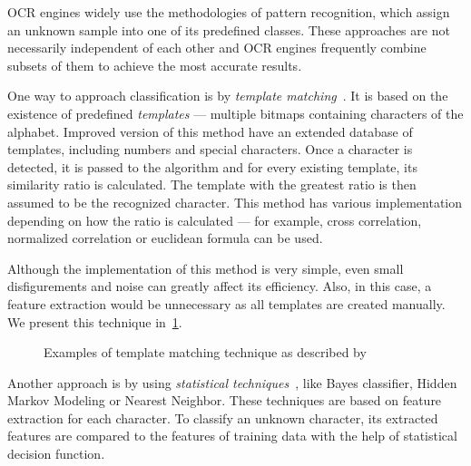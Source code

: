OCR engines widely use the methodologies of pattern recognition, which assign an unknown sample into one of its predefined classes. These approaches are not necessarily independent of each other and OCR engines frequently combine subsets of them to achieve the most accurate results.

One way to approach classification is by \emph{template matching}~\citep{templateMatching}. It is based on the existence of predefined \emph{templates} --- multiple bitmaps containing characters of the alphabet. Improved version of this method have an extended database of templates, including numbers and special characters. Once a character is detected, it is passed to the algorithm and for every existing template, its similarity ratio is calculated. The template with the greatest ratio is then assumed to be the recognized character. This method has various implementation depending on how the ratio is calculated --- for example, cross correlation, normalized correlation or euclidean formula can be used.

Although the implementation of this method is very simple, even small disfigurements and noise can greatly affect its efficiency. Also, in this case, a feature extraction would be unnecessary as all templates are created manually. We present this technique in~\cref{fig:characterClassTemplate}.

\begin{figure}[t]
    \noindent
	\caption{Examples of template matching technique as described by~\citet{Ning1993AnIO}}
	\label{fig:characterClassTemplate}
\end{figure}

Another approach is by using \emph{statistical techniques}~\citep{characterClassification}, like Bayes classifier, Hidden Markov Modeling or Nearest Neighbor. These techniques are based on feature extraction for each character. To classify an unknown character, its extracted features are compared to the features of training data with the help of statistical decision function. 


